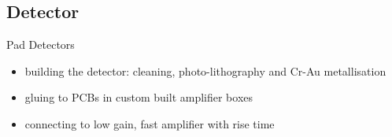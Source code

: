 \subsection{Detector}
\begin{frame}{Pad Detectors}

	\vspace*{-10pt}\vspace*{-5pt}
	
	\begin{itemize}\itemfill
		\item building the detector: cleaning, photo-lithography and Cr-Au metallisation
		\item gluing to PCBs in custom built amplifier boxes
		\item connecting to low gain, fast amplifier with  rise time
	\end{itemize}
	
\end{frame}

